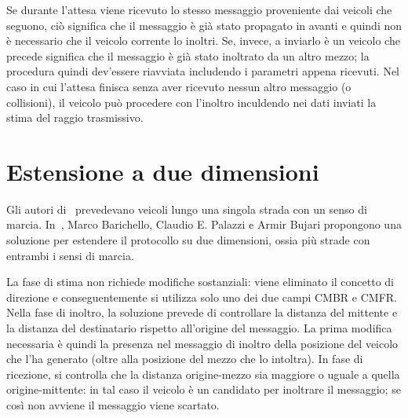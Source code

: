 Se durante l'attesa viene ricevuto lo stesso messaggio proveniente dai veicoli che seguono, ciò significa che il messaggio è già stato propagato in avanti e quindi non è necessario
che il veicolo corrente lo inoltri.
Se, invece, a inviarlo è un veicolo che precede significa che il messaggio è già stato inoltrato da un altro mezzo; la procedura quindi dev'essere riavviata includendo i parametri appena ricevuti.
Nel caso in cui l'attesa finisca senza aver ricevuto nessun altro messaggio (o collisioni), il veicolo può procedere con l'inoltro inculdendo nei dati inviati la stima del raggio trasmissivo.
%
\section{Estensione a due dimensioni}
Gli autori di~\cite{Palazzi07howdo} prevedevano veicoli lungo una singola strada con un senso di marcia.
In~\cite{Barichello2017propagazione}, Marco Barichello, Claudio E. Palazzi e Armir Bujari propongono una soluzione per estendere il protocollo su due dimensioni,
ossia più strade con entrambi i sensi di marcia.

La fase di stima non richiede modifiche sostanziali: viene eliminato il concetto di direzione e conseguentemente si utilizza solo uno dei due campi CMBR e CMFR.
Nella fase di inoltro, la soluzione prevede di controllare la distanza del mittente e la distanza del destinatario rispetto all'origine del messaggio.
La prima modifica necessaria è quindi la presenza nel messaggio di inoltro della posizione del veicolo che l'ha generato (oltre alla posizione del mezzo che lo intoltra).
In fase di ricezione, si controlla che la distanza origine-mezzo sia maggiore o uguale a quella origine-mittente: in tal caso il veicolo è un candidato per inoltrare il messaggio;
se così non avviene il messaggio viene scartato.
%
